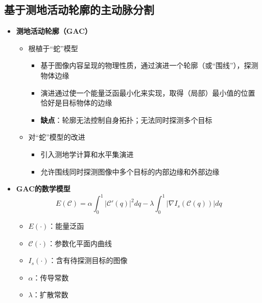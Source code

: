 \subsection[主动脉分割]{基于测地活动轮廓的主动脉分割}

\begin{frame}
\begin{itemize}
\item \textbf{测地活动轮廓（GAC）}
\begin{itemize}
\item 根植于“蛇”模型
\begin{itemize}
\item 基于图像内容呈现的物理性质，通过演进一个轮廓（或“围线”），探测物体边缘
\item 演进通过使一个能量泛函最小化来实现，取得（局部）最小值的位置恰好是目标物体的边缘
\item \textbf{缺点}：轮廓无法控制自身拓扑；无法同时探测多个目标
\end{itemize}
\item 对“蛇”模型的改进
\begin{itemize}
\item 引入测地学计算和水平集演进
\item 允许围线同时探测图像中多个目标的内部边缘和外部边缘
\end{itemize}
\end{itemize}
\end{itemize}
\end{frame}

\begin{frame}
\begin{itemize}
\item \textbf{GAC的数学模型}
\begin{equation*}
E(\mathcal{C}) = \alpha \int_0^1 | \mathcal{C}'(q) |^2 dq - \lambda \int_0^1 | \nabla I_{s} ( \mathcal{C}(q) ) |dq
\end{equation*}
\begin{itemize}
\item $E(\cdot)$：能量泛函
\item $\mathcal{C}(\cdot)$：参数化平面内曲线
\item $I_{s}(\cdot)$：含有待探测目标的图像
\item $\alpha$：传导常数
\item $\lambda$：扩散常数
\end{itemize}
\end{itemize}
\end{frame}

